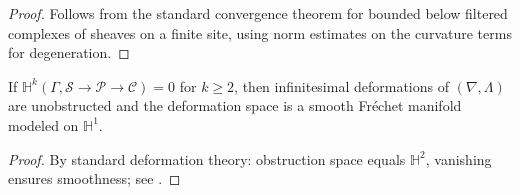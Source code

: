 \begin{proof}
Follows from the standard convergence theorem for bounded below filtered complexes of sheaves on a finite site, using norm estimates on the curvature terms for degeneration. \relax
\end{proof}


\begin{corollary}\label{cor:smoothness}
If $\mathbb H^k(\Gamma,\mathcal S\!\to\!\mathcal P\!\to\!\mathcal C)=0$ for $k\ge2$, then infinitesimal deformations of $(\nabla,\Lambda)$ are unobstructed and the deformation space is a smooth Fréchet manifold modeled on $\mathbb H^1$.
\end{corollary}

\begin{proof}
By standard deformation theory: obstruction space equals $\mathbb H^2$, vanishing ensures smoothness; see \cite{Schlessinger1968,Manetti2004}. \relax
\end{proof}


